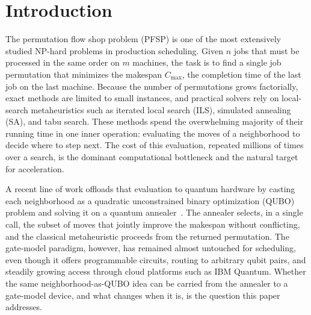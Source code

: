 \documentclass{svproc}
\newcommand{\rev}[1]{{\color{blue}#1}}
\newcommand{\rev}[1]{#1}
\begin{document}
\section{Introduction}
\label{sec:intro}
The permutation flow shop problem (PFSP) is one of the most extensively
studied NP-hard problems in production scheduling. Given $n$ jobs that
must be processed in the same order on $m$ machines, the task is to find
a single job permutation that minimizes the makespan $C_{\max}$, the
completion time of the last job on the last machine. Because the number
of permutations grows factorially, exact methods are limited to small
instances, and practical solvers rely on local-search metaheuristics
such as iterated local search \rev{(ILS)}, simulated annealing \rev{(SA)}, and tabu search.
These methods spend the overwhelming majority of their running time in
one inner operation: evaluating the moves of a neighborhood to decide
where to step next. The cost of this evaluation, repeated millions of
times over a search, is the dominant computational bottleneck and the
natural target for acceleration.

A recent line of work offloads that evaluation to quantum hardware by
casting each neighborhood as a quadratic unconstrained binary
optimization (QUBO) problem and solving it on a quantum
annealer~\rev{\cite{bozejko2026fibonacci,wojewodzki2026windowed}}. The
annealer selects, in a single call, the subset of moves that jointly
improve the makespan without conflicting, and the classical
metaheuristic proceeds from the returned permutation. The gate-model
paradigm, however, has remained almost untouched for scheduling, even
though it offers programmable circuits, routing to arbitrary qubit
pairs, and steadily growing access through cloud platforms such as IBM
Quantum. Whether the same neighborhood-as-QUBO idea can be carried from
the annealer to a gate-model device, and what changes when it is, is the
question this paper addresses.
\end{document}
